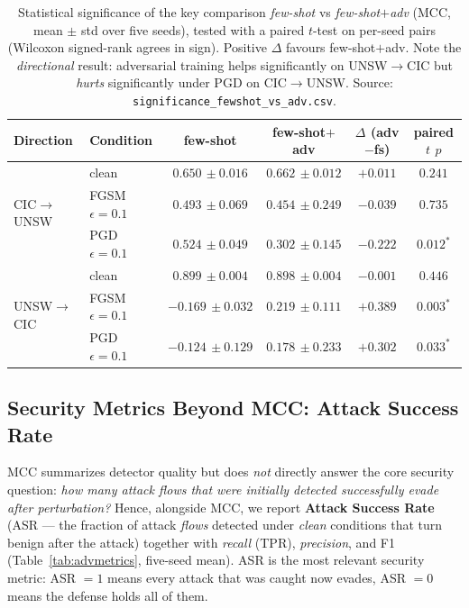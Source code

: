 \documentclass[preprint,12pt,authoryear]{elsarticle}
\begin{document}
\begin{table}[h]
\centering
\caption{Statistical significance of the key comparison \emph{few-shot} vs
\emph{few-shot$+$adv} (MCC, mean $\pm$ std over five seeds), tested with a paired
$t$-test on per-seed pairs (Wilcoxon signed-rank agrees in sign). Positive $\Delta$
favours few-shot$+$adv. Note the \emph{directional} result: adversarial training
helps significantly on UNSW$\rightarrow$CIC but \emph{hurts} significantly under PGD
on CIC$\rightarrow$UNSW. Source: \texttt{significance\_fewshot\_vs\_adv.csv}.}
\label{tab:significance}
\small
\begin{tabular}{llcccc}
\toprule
Direction & Condition & few-shot & few-shot$+$adv & $\Delta$ (adv$-$fs) & paired $t$ $p$ \\
\midrule
\multirow{3}{*}{CIC$\rightarrow$UNSW}
 & clean            & $0.650\,{\pm}0.016$ & $0.662\,{\pm}0.012$ & $+0.011$ & $0.241$ \\
 & FGSM $\epsilon{=}0.1$ & $0.493\,{\pm}0.069$ & $0.454\,{\pm}0.249$ & $-0.039$ & $0.735$ \\
 & PGD $\epsilon{=}0.1$  & $0.524\,{\pm}0.049$ & $0.302\,{\pm}0.145$ & $-0.222$ & $\mathbf{0.012}^{\ast}$ \\
\midrule
\multirow{3}{*}{UNSW$\rightarrow$CIC}
 & clean            & $0.899\,{\pm}0.004$ & $0.898\,{\pm}0.004$ & $-0.001$ & $0.446$ \\
 & FGSM $\epsilon{=}0.1$ & $-0.169\,{\pm}0.032$ & $\mathbf{0.219\,{\pm}0.111}$ & $+0.389$ & $\mathbf{0.003}^{\ast}$ \\
 & PGD $\epsilon{=}0.1$  & $-0.124\,{\pm}0.129$ & $\mathbf{0.178\,{\pm}0.233}$ & $+0.302$ & $\mathbf{0.033}^{\ast}$ \\
\bottomrule
\end{tabular}

\vspace{0.3em}
\end{table}

\subsection{Security Metrics Beyond MCC: Attack Success Rate}
\label{sec:advmetrics}
MCC summarizes detector quality but does \emph{not} directly answer the core
security question: \emph{how many attack \emph{flows} that were initially detected
successfully evade after perturbation?} Hence, alongside MCC, we report
\textbf{Attack Success Rate} (ASR --- the fraction of attack \emph{flows} detected
under \emph{clean} conditions that turn benign after the attack) together with
\emph{recall} (TPR), \emph{precision}, and F1 (Table~\ref{tab:advmetrics}, five-seed
mean). ASR is the most relevant security metric: ASR $=1$ means every attack that
was caught now evades, ASR $=0$ means the defense holds all of them.
\end{document}
